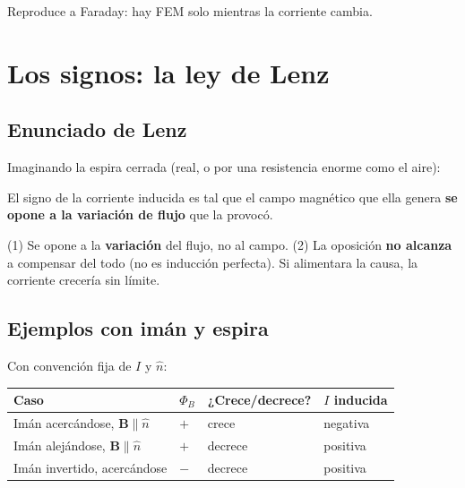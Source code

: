 \documentclass[12pt,a4paper]{article}
\begin{document}
Reproduce a Faraday: hay FEM solo mientras la corriente cambia.



\section{Los signos: la ley de Lenz}

\subsection{Enunciado de Lenz}

Imaginando la espira cerrada (real, o por una resistencia enorme como el aire):

\begin{keybox}
  El signo de la corriente inducida es tal que el campo magnético que ella
  genera \textbf{se opone a la variación de flujo} que la provocó.
\end{keybox}

\begin{warnbox}
  (1) Se opone a la \textbf{variación} del flujo, no al campo. (2) La oposición
  \textbf{no alcanza} a compensar del todo (no es inducción perfecta). Si
  alimentara la causa, la corriente crecería sin límite.
\end{warnbox}

\subsection{Ejemplos con imán y espira}

Con convención fija de $I$ y $\hat n$:

\begin{center}
\begin{tabular}{@{}llll@{}}
\toprule
Caso & $\Phi_B$ & ¿Crece/decrece? & $I$ inducida \\
\midrule
Imán acercándose, $\mathbf{B}\parallel\hat n$ & $+$ & crece & negativa \\
Imán alejándose, $\mathbf{B}\parallel\hat n$ & $+$ & decrece & positiva \\
Imán invertido, acercándose & $-$ & decrece & positiva \\
\bottomrule
\end{tabular}
\end{center}
\end{document}
